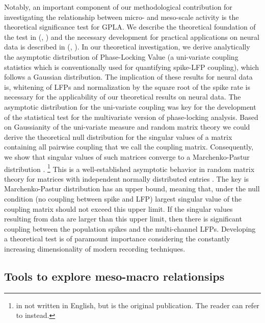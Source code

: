Notably,
an important component of our methodological contribution for investigating the relationship between micro- and meso-scale activity is the theoretical significance test for GPLA. 
We describe the theoretical foundation of the test in \citet{safaviUncoveringOrganizationNeural2023}
(\seealso, )
and the necessary development for practical applications on neural data
is described in \citet{safaviUncoveringOrganizationNeural2023}
(\seealso, ).
In our theoretical investigation, we derive analytically the asymptotic distribution of Phase-Locking Value
(a uni-variate coupling statistics which is conventionally used for quantifying spike-LFP coupling),
which follows a Gaussian distribution.
The implication of these results for neural data is,
whitening of LFPs and normalization by the square root of the spike rate is necessary for the applicability of our theoretical results on neural data.
The asymptotic distribution for the uni-variate coupling was key for the development of the statistical test for the multivariate version of phase-locking analysis.
Based on Gaussianity of the uni-variate measure and random matrix theory we could derive the theoretical null distribution for the singular values of a matrix containing all pairwise coupling
that we call the coupling matrix.
Consequently, we show that singular values of such matrices converge to a
Marchenko-Pastur distribution
\citep{marcenkoDistributionEigenvaluesSets1967a}.
\footnote{\citet{marcenkoDistributionEigenvaluesSets1967a} in not
  written in English, but is the original publication.
  The reader can refer to \citet[Chapter
  2]{andersonIntroductionRandomMatrices2010} instead.}
This is a well-established asymptotic behavior in random matrix theory for matrices with independent normally distributed entries \cite{andersonIntroductionRandomMatrices2010}. 
The key is Marchenko-Pastur distribution has an upper bound, meaning that, 
under the null condition (no coupling between spike and LFP) largest singular value of the coupling matrix should not exceed this upper limit. 
If the singular values resulting from data are larger than this upper limit, 
then there is significant coupling between the population spikes and the multi-channel LFPs.
Developing a theoretical test is of paramount importance considering the constantly increasing dimensionality of modern recording techniques. 
\subsection{Tools to explore meso-macro relationsips}\label{sec:relat-betw-meso}

